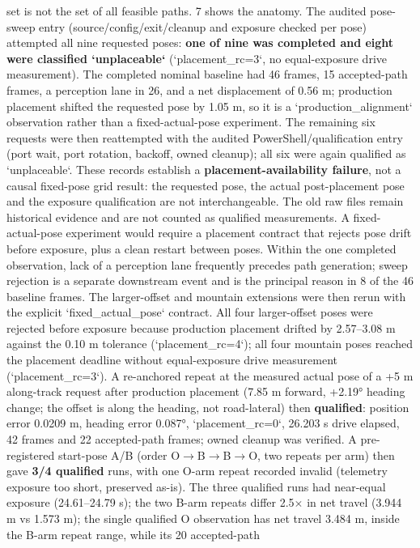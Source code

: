 \documentclass[journal]{IEEEtran}
\begin{document}
set is not the set of all feasible paths. 7 shows the anatomy.
The audited pose-sweep entry (source/config/exit/cleanup and exposure checked per pose) attempted
all nine requested poses: \textbf{one of nine was completed and eight were classified `unplaceable`}
(`placement_rc=3`, no equal-exposure drive measurement). The completed nominal baseline had 46 frames,
15 accepted-path frames, a perception lane in 26, and a net displacement of 0.56 m; production placement
shifted the requested pose by 1.05 m, so it is a `production_alignment` observation rather than a
fixed-actual-pose experiment. The remaining six requests were then reattempted with the audited
PowerShell/qualification entry (port wait, port rotation, backoff, owned cleanup); all six were again
qualified as `unplaceable`. These records establish a \textbf{placement-availability failure}, not a causal
fixed-pose grid result: the requested pose, the actual post-placement pose and the exposure qualification
are not interchangeable. The old raw files remain historical evidence and are not counted as qualified
measurements. A fixed-actual-pose experiment would require a placement contract that rejects pose drift
before exposure, plus a clean restart between poses. Within the one completed observation, lack of a
perception lane frequently precedes path generation; sweep rejection is a separate downstream event and
is the principal reason in 8 of the 46 baseline frames. The larger-offset and mountain extensions were then rerun with the explicit `fixed_actual_pose` contract.
All four larger-offset poses were rejected before exposure because production placement drifted by 2.57--3.08 m
against the 0.10 m tolerance (`placement_rc=4`); all four mountain poses reached the placement deadline
without equal-exposure drive measurement (`placement_rc=3`). A re-anchored repeat at the measured actual
pose of a +5 m along-track request after production placement (7.85 m forward, +2.19° heading change; the
offset is along the heading, not road-lateral) then \textbf{qualified}: position error 0.0209 m,
heading error 0.087°, `placement_rc=0`, 26.203 s drive elapsed, 42 frames and 22 accepted-path frames; owned cleanup
was verified. A pre-registered start-pose A/B (order O$\rightarrow$B$\rightarrow$B$\rightarrow$O, two repeats per arm) then gave \textbf{3/4 qualified}
runs, with one O-arm repeat recorded invalid (telemetry exposure too short, preserved as-is). The three qualified
runs had near-equal exposure (24.61--24.79 s); the two B-arm repeats differ 2.5$\times$ in net travel (3.944 m vs 1.573 m);
the single qualified O observation has net travel 3.484 m, inside the B-arm repeat range, while its 20 accepted-path
\end{document}
